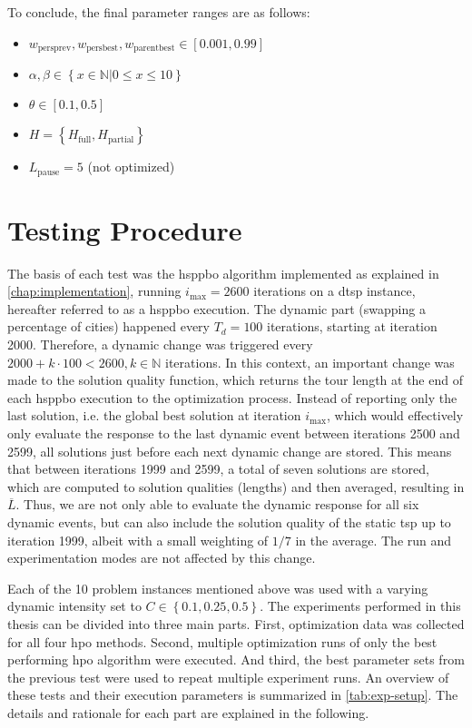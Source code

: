 To conclude, the final parameter ranges are as follows:
\begin{itemize}
	\item $w_{\text{persprev}}, w_{\text{persbest}}, w_{\text{parentbest}} \in [0.001,0.99]$
	\item $\alpha, \beta \in \left\lbrace x\in\mathbb{N} | 0 \leq x \leq 10 \right\rbrace$
	\item $\theta \in [0.1,0.5]$
	\item $H = \left\lbrace H_{\text{full}}, H_{\text{partial}} \right\rbrace$
	\item $L_\text{pause} = 5$ (not optimized)
	
\end{itemize}

\section{Testing Procedure}
\label{chap:testing}

The basis of each test was the \gls{hsppbo} algorithm implemented as explained in \cref{chap:implementation}, running $i_\text{max} = 2600$ iterations on a \gls{dtsp} instance, hereafter referred to as a \gls{hsppbo} execution. The dynamic part (swapping a percentage of cities) happened every $T_d = 100$ iterations, starting at iteration 2000. Therefore, a dynamic change was triggered every $2000 + k \cdot 100 < 2600, k \in \mathbb{N}$ iterations. In this context, an important change was made to the solution quality function, which returns the tour length at the end of each \gls{hsppbo} execution to the optimization process. Instead of reporting only the last solution, i.e. the global best solution at iteration $i_\text{max}$, which would effectively only evaluate the response to the last dynamic event between iterations 2500 and 2599, all solutions just before each next dynamic change are stored. This means that between iterations 1999 and 2599, a total of seven solutions are stored, which are computed to solution qualities (lengths) and then averaged, resulting in $\overline{L}$. Thus, we are not only able to evaluate the dynamic response for all six dynamic events, but can also include the solution quality of the static \gls{tsp} up to iteration 1999, albeit with a small weighting of $1/7$ in the average. The run and experimentation modes are not affected by this change.

Each of the 10 problem instances mentioned above was used with a varying dynamic intensity set to $C \in \left\lbrace 0.1,0.25,0.5\right\rbrace$. The experiments performed in this thesis can be divided into three main parts. First, optimization data was collected for all four \gls{hpo} methods. Second, multiple optimization runs of only the best performing \gls{hpo} algorithm were executed. And third, the best parameter sets from the previous test were used to repeat multiple experiment runs. An overview of these tests and their execution parameters is summarized in \cref{tab:exp-setup}. The details and rationale for each part are explained in the following. 

